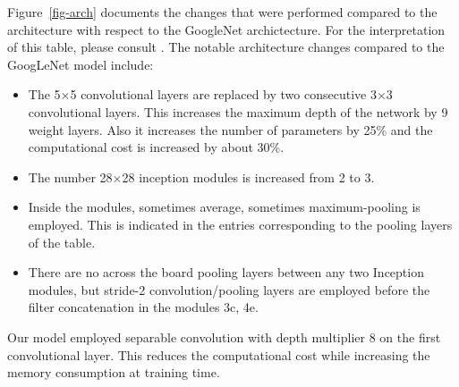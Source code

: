 \documentclass[twocolumn]{article}
\begin{document}
Figure~\ref{fig-arch} documents the changes that were performed compared to the architecture with respect to the GoogleNet archictecture. For the interpretation of this table, please consult \cite{inception}. The notable architecture changes compared to the GoogLeNet model include:
\begin{itemize}
\item The 5${\times}$5 convolutional layers are replaced by two consecutive 3${\times}$3 convolutional layers. This increases the maximum depth of the network by 9 weight layers. Also it increases the number of parameters by 25\% and the computational cost is increased by about 30\%.
\item The number 28${\times}$28 inception modules is increased from 2 to 3.
\item Inside the modules, sometimes average, sometimes maximum-pooling is employed. This is indicated in the entries corresponding to the pooling layers of the table.
\item There are no across the board pooling layers between any two Inception modules, but stride-2 convolution/pooling layers are employed before the filter concatenation in the modules 3c, 4e.
\end{itemize}
Our model employed separable convolution with depth multiplier $8$ on the first convolutional layer. This reduces the computational cost while increasing the memory consumption at training time.
\end{document}
